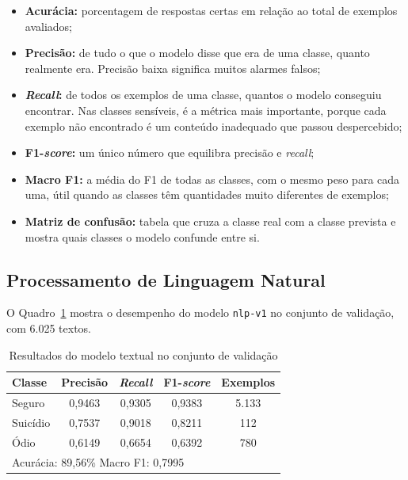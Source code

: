 \documentclass[
    12pt,           %
    oneside,        %
    a4paper,        %
    chapter=TITLE,  %
    english,        %
    brazil          %
]{abntex2}
\begin{document}
\begin{itemize}
    \item \textbf{Acurácia:} porcentagem de respostas certas em relação ao
    total de exemplos avaliados;
    \item \textbf{Precisão:} de tudo o que o modelo disse que era de uma
    classe, quanto realmente era. Precisão baixa significa muitos alarmes
    falsos;
    \item \textbf{\textit{Recall}:} de todos os exemplos de uma classe, quantos
    o modelo conseguiu encontrar. Nas classes sensíveis, é a métrica mais
    importante, porque cada exemplo não encontrado é um conteúdo inadequado
    que passou despercebido;
    \item \textbf{F1-\textit{score}:} um único número que equilibra precisão e
    \textit{recall};
    \item \textbf{Macro F1:} a média do F1 de todas as classes, com o mesmo
    peso para cada uma, útil quando as classes têm quantidades muito
    diferentes de exemplos;
    \item \textbf{Matriz de confusão:} tabela que cruza a classe real com a
    classe prevista e mostra quais classes o modelo confunde entre si.
\end{itemize}
\subsection{Processamento de Linguagem Natural}

O Quadro~\ref{tab:resultados-validacao} mostra o desempenho do modelo
\texttt{nlp-v1} no conjunto de validação, com 6.025 textos.
\begin{table}[htbp]
\centering
\small
\renewcommand{\arraystretch}{1.3}
\begin{tabular}{|l|c|c|c|c|}
\hline
\textbf{Classe} & \textbf{Precisão} & \textbf{\textit{Recall}} & \textbf{F1-\textit{score}} & \textbf{Exemplos} \\ \hline
Seguro & 0,9463 & 0,9305 & 0,9383 & 5.133 \\ \hline
Suicídio & 0,7537 & 0,9018 & 0,8211 & 112 \\ \hline
Ódio & 0,6149 & 0,6654 & 0,6392 & 780 \\ \hline
\multicolumn{5}{|l|}{Acurácia: 89,56\% \quad Macro F1: 0,7995} \\ \hline
\end{tabular}
\caption{Resultados do modelo textual no conjunto de validação}
\label{tab:resultados-validacao}
\end{table}
\end{document}
